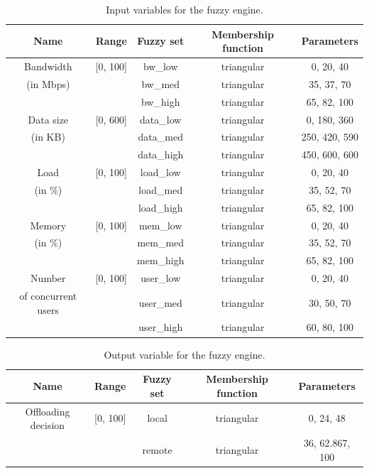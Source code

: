 \begin{table}[H]
	\centering
	\begin{tabular}{|c|c|c|c|c|}
		\hline
		Name                & Range    & Fuzzy set & Membership function & Parameters    \\
		\hline
		Bandwidth           & [0, 100] & bw_low    & triangular          & 0, 20, 40     \\
		(in Mbps)           &          & bw_med    & triangular          & 35, 37, 70    \\
		                    &          & bw_high   & triangular          & 65, 82, 100   \\
		\hline
		Data size           & [0, 600] & data_low  & triangular          & 0, 180, 360   \\
		(in KB)             &          & data_med  & triangular          & 250, 420, 590 \\
		                    &          & data_high & triangular          & 450, 600, 600 \\
		\hline
		Load                & [0, 100] & load_low  & triangular          & 0, 20, 40     \\
		(in \%)             &          & load_med  & triangular          & 35, 52, 70    \\
		                    &          & load_high & triangular          & 65, 82, 100   \\
		\hline
		Memory              & [0, 100] & mem_low   & triangular          & 0, 20, 40     \\
		(in \%)             &          & mem_med   & triangular          & 35, 52, 70    \\
		                    &          & mem_high  & triangular          & 65, 82, 100   \\
		\hline
		Number              & [0, 100] & user_low  & triangular          & 0, 20, 40     \\
		of concurrent users &          & user_med  & triangular          & 30, 50, 70    \\
		                    &          & user_high & triangular          & 60, 80, 100   \\
		\hline
	\end{tabular}
	\caption{Input variables for the fuzzy engine.}
	\label{tab:new-fuzzy-input}
\end{table}

\begin{table}[H]
	\centering
	\begin{tabular}{|c|c|c|c|c|}
		\hline
		Name                & Range    & Fuzzy set & Membership function & Parameters      \\
		\hline
		Offloading decision & [0, 100] & local     & triangular          & 0, 24, 48       \\
		                    &          & remote    & triangular          & 36, 62.867, 100 \\
		\hline
	\end{tabular}
	\caption{Output variable for the fuzzy engine.}
	\label{tab:new-fuzzy-output}
\end{table}

